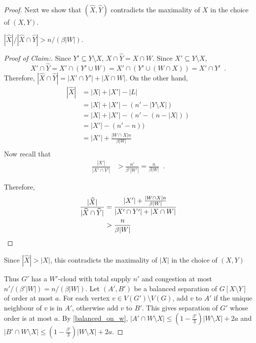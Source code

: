 \documentclass{patmorin}
\newenvironment{clmproof}{\begin{proof}[Proof of Claim:]\renewcommand{\qedsymbol}{\rule{1ex}{1ex}}}{\end{proof}}
\begin{document}
\begin{proof}
  Next we show that $(\widehat{X},\widehat{Y})$ contradicts the maximality of $X$ in the choice of $(X,Y)$.

  \begin{clm}
    $|\widehat{X}|/|\widehat{X}\cap\widehat{Y}|>n/(\beta|W|)$.
  \end{clm}

  \begin{clmproof}
    Since $Y'\subseteq Y\setminus X$, $X\cap \hat{Y}=X\cap W$. Since $X'\subseteq Y\setminus X$,
    \[
      X'\cap \widehat{Y}=X'\cap (Y'\cup W)=X'\cap (Y'\cup (W\cap X))=X'\cap Y' \enspace .
    \]
    Therefore, $|\widehat{X}\cap\widehat{Y}|=|X'\cap Y'|+|X\cap W|$.
    On the other hand,
    \begin{align*}
      |\widehat{X}|
        & = |X| + |X'| - |L| \\
        & = |X| + |X'| - (n'-|Y\setminus X|) \\
        & = |X| + |X'| - (n'-(n-|X|)) \\
        & = |X'| - (n'-n)) \\
        & = |X'| + \frac{|W\cap X|n}{\beta|W|} \\
    \end{align*}
    Now recall that
    \begin{align*}
      \frac{|X'|}{|X'\cap Y'|}
        & >  \frac{n'}{\beta'|W'|} = \frac{n}{\beta|W|} \enspace .
    \end{align*}


    Therefore,
    \begin{align*}
      \frac{|\widehat{X}|}{|\widehat{X}\cap\widehat{Y}|}
        & = \frac{|X'| + \frac{|W\cap X|n}{\beta|W|}}{|X'\cap Y'|+|X\cap W|}  \\
        & > \frac{n}{\beta|W|} \qedhere
    \end{align*}
  \end{clmproof}
  Since $|\widehat{X}|>|X|$, this contradicts the maximality of $|X|$ in the choice of $(X,Y)$

  Thus $G'$ has a $W'$-cloud with total supply $n'$ and congestion at most $n'/(\beta'|W|)=n/(\beta|W|)$.  Let $(A',B')$ be a balanced separation of $G[X\setminus Y]$ of order at most $a$.  For each vertex $v\in V(G')\setminus V(G)$, add $v$ to $A'$ if the unique neighbour of $v$ is in $A'$, otherwise add $v$ to $B'$.  This gives separation of $G'$ whose order is at most $a$.  By \cref{balanced_on_w}, $|A'\cap W\setminus X|\le (1-\tfrac{\beta'}{3})|W\setminus X|+2a$ and $|B'\cap W\setminus X|\le (1-\tfrac{\beta'}{3})|W\setminus X|+2a$.


\end{proof}
\end{document}
